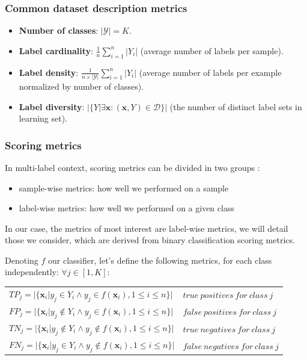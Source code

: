 \subsubsection{Common dataset description metrics}

\begin{itemize}
	\item \textbf{Number of classes}: $|\mathcal{Y}| = K$.
	\item \textbf{Label cardinality}: $\frac{1}{n}\sum_{i=1}^n |Y_i|$ (average number of labels per sample).
	\item \textbf{Label density}: $\frac{1}{n \times |\mathcal{Y}|}\sum_{i=1}^n |Y_i|$ (average number of labels per example normalized by number of classes).
	\item \textbf{Label diversity}: $|\{Y | \exists \mathbf{x}:(\mathbf{x}, Y) \in \mathcal{D}\}|$ (the number of distinct label sets in learning set).
\end{itemize}


\subsubsection{Scoring metrics}

In multi-label context, scoring metrics can be divided in two groups \cite{MultilabelReview}: 
\begin{itemize}
	\item sample-wise metrics: how well we performed on a sample
	\item label-wise metrics: how well we performed on a given class
\end{itemize}

In our case, the metrics of most interest are label-wise metrics, we will detail those we consider, which are derived from binary classification scoring metrics.  

Denoting $f$ our classifier, let's define the following metrics, for each class independently:
$\forall j \in [1, K]$:
{\ttfamily
\begin{table}[H]
    \centering
    \begin{tabular}{ll}
        \toprule
        $TP_j = |\{ \mathbf{x}_i | y_j \in Y_i \wedge y_j \in f(\mathbf{x}_i), 1 \leq i \leq n \}|$          &    $true\ positives\ for\ class\ j$ \\
        $FP_j = |\{ \mathbf{x}_i | y_j \notin Y_i \wedge y_j \in f(\mathbf{x}_i), 1 \leq i \leq n \}|$          &    $false\ positives\ for\ class\ j$ \\
        $TN_j = |\{ \mathbf{x}_i | y_j \notin Y_i \wedge y_j \notin f(\mathbf{x}_i), 1 \leq i \leq n \}|$       &    $true\ negatives\ for\ class\ j$  \\
        $FN_j = |\{ \mathbf{x}_i | y_j \in Y_i \wedge y_j \notin f(\mathbf{x}_i), 1 \leq i \leq n \}|$       &    $false\ negatives\ for\ class\ j$  \\
        \bottomrule
    \end{tabular}
\end{table}
}

